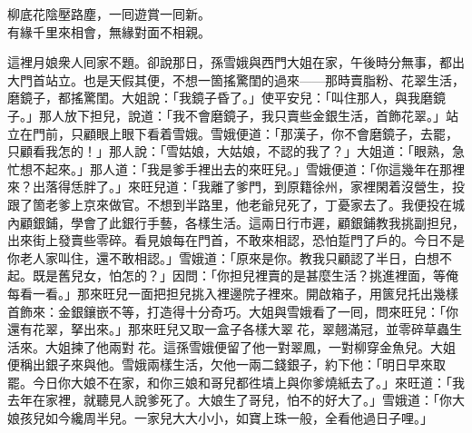 \begin{myquote}
柳底花陰壓路塵，一囘遊賞一囘新。\\有緣千里來相會，無緣對面不相親。
\end{myquote}

這裡月娘衆人囘家不題。卻說那日，孫雪娥與西門大姐在家，午後時分無事，都出大門首站立。也是天假其便，不想一箇搖驚閨的過來——那時賣脂粉、花翠生活，磨鏡子，都搖驚閨。大姐說：「我鏡子昏了。」使平安兒：「叫住那人，與我磨鏡子。」那人放下担兒，說道：「我不會磨鏡子，我只賣些金銀生活，首飾花翠。」站立在門前，只顧眼上眼下看着雪娥。雪娥便道：「那漢子，你不會磨鏡子，去罷，只顧看我怎的！」{}那人說：「雪姑娘，大姑娘，不認的我了？」大姐道：「眼熟，急忙想不起來。」那人道：「我是爹手裡出去的來旺兒。」雪娥便道：「你這幾年在那裡來？出落得恁胖了。」來旺兒道：「我離了爹門，到原籍徐州，家裡閑着沒營生，投跟了箇老爹上京來做官。不想到半路里，他老爺兒死了，丁憂家去了。我便投在城內顧銀鋪，學會了此銀行手藝，各樣生活。這兩日行市遲，顧銀鋪教我挑副担兒，出來街上發賣些零碎。看見娘每在門首，不敢來相認，恐怕踅門了戶的。今日不是你老人家叫住，還不敢相認。」雪娥道：「原來是你。教我只顧認了半日，白想不起。既是舊兒女，怕怎的？」因問：「你担兒裡賣的是甚麼生活？挑進裡面，等俺每看一看。」那來旺兒一面把担兒挑入裡邊院子裡來。開啟箱子，用篋兒托出幾樣首飾來：金銀鑲嵌不等，打造得十分奇巧。大姐與雪娥看了一囘，問來旺兒：「你還有花翠，拏出來。」那來旺兒又取一盒子各樣大翠𩬆花，翠翹滿冠，並零碎草蟲生活來。大姐揀了他兩對𩬆花。這孫雪娥便留了他一對翠鳳，一對柳穿金魚兒。大姐便稱出銀子來與他。雪娥兩樣生活，欠他一兩二錢銀子，約下他：「明日早來取罷。今日你大娘不在家，和你三娘和哥兒都徃墳上與你爹燒紙去了。」來旺道：「我去年在家裡，就聽見人說爹死了。大娘生了哥兒，怕不的好大了。」雪娥道：「你大娘孩兒如今纔周半兒。一家兒大大小小，如寶上珠一般，全看他過日子哩。」

